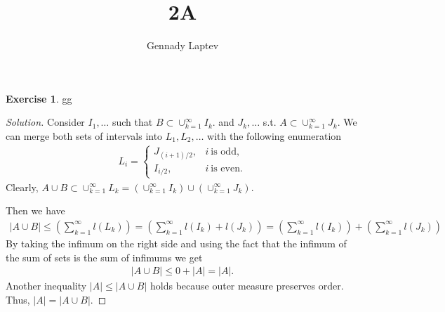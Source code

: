 \documentclass[letterpaper, 11pt, english]{article}
\title{2A}
\author{Gennady Laptev}
\date{}
\theoremstyle{definition}
\theoremstyle{definition}
\newtheorem{problem}{Exercise}
\theoremstyle{definition}
\newenvironment{sol}{\begin{proof}[Solution]}{\end{proof}}
\theoremstyle{plain} %
\theoremstyle{plain} %
\theoremstyle{plain} %
\theoremstyle{plain} %
\theoremstyle{remark}
\begin{document}
\maketitle
\setcounter{section}{0}

\setcounter{problem}{0}
\begin{problem}gg
\begin{sol}
    Consider $ I_1, \ldots $ such that
    $ B \subset \cup_{k=1}^{ \infty} I_k $.
    and $ J_k, \ldots $ s.t. $ A \subset 
    \cup_{k=1}^{ \infty} J_k$. We can merge both sets of intervals into 
    $ L_1, L_2, \ldots $
    with the following enumeration 
    \begin{gather*}
        L_i = 
       \begin{cases}
           J_{(i+1)/2}, & i~\textrm{is odd}, \\ 
           I_{i/2}, & i~\textrm{is even}.
       \end{cases}
    \end{gather*}
    Clearly, $ A \cup B \subset \cup_{k=1}^{ \infty} L_k =
    \left( \cup_{k=1}^{ \infty} I_k \right)
    \cup \left( \cup_{k=1}^{ \infty} J_k \right)
    $. 

    Then we have 
    \begin{gather*}
        \lvert A \cup B \rvert \leq  
        \left( \sum_{k=1}^{ \infty} l(L_k) \right) = 
        \left( \sum_{k=1}^{ \infty} l(I_k) + l(J_k) \right)
        =
        \left( \sum_{k=1}^{ \infty} l(I_k) \right)
        + \left( \sum_{k=1}^{ \infty} l(J_k) \right) 
    \end{gather*}
    By taking the infimum on the right side and using the fact that the 
    infimum of the sum of sets is the sum of infimums we get
    \begin{gather*}
        \lvert A \cup B \rvert \leq 0 + \lvert A \rvert = \lvert A \rvert.
    \end{gather*}
    Another inequality $ \lvert A \rvert \leq \lvert A \cup B \rvert  $  holds because 
    outer measure preserves order.
    Thus, $ \lvert A \rvert  = \lvert A \cup B \rvert  $.
\end{sol}
\end{problem}
\end{document}
